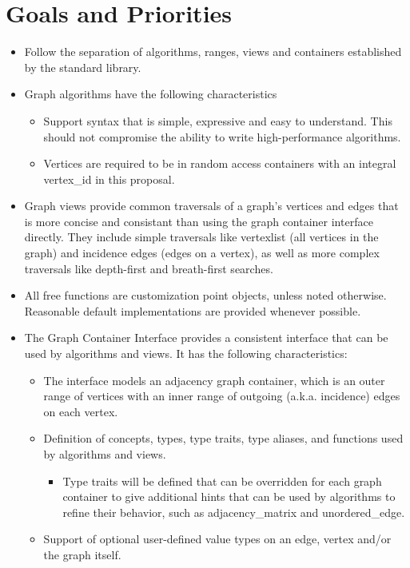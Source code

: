 \section{Goals and Priorities}
\begin{itemize}
\item Follow the separation of algorithms, ranges, views and containers established by the standard library.
\item Graph algorithms have the following characteristics
\begin{itemize}
\item Support syntax that is simple, expressive and easy to understand. This should not compromise the ability to write high-performance algorithms.
\item Vertices are required to be in random access containers with an integral vertex\_id in this proposal.
\end{itemize}
\item Graph views provide common traversals of a graph's vertices and edges that is more concise and consistant than using the graph container interface directly. They include simple traversals like vertexlist (all vertices in the graph) and incidence edges (edges on a vertex), as well as more complex traversals like depth-first and breath-first searches.
\item All free functions are customization point objects, unless noted otherwise. Reasonable default implementations are provided whenever possible.
\item The Graph Container Interface provides a consistent interface that can be used by algorithms and views. It has the following characteristics:
\begin{itemize}
\item The interface models an adjacency graph container, which is an outer range of vertices with an inner range of outgoing (a.k.a. incidence) edges on each vertex. 
\item Definition of concepts, types, type traits, type aliases, and functions used by algorithms and views.
\begin{itemize}
\item Type traits will be defined that can be overridden for each graph container to give additional hints that can be used by algorithms to refine their behavior, such as adjacency\_matrix and unordered\_edge.
\end{itemize}
\item Support of optional user-defined value types on an edge, vertex and/or the graph itself.

\end{itemize}
\end{itemize}
